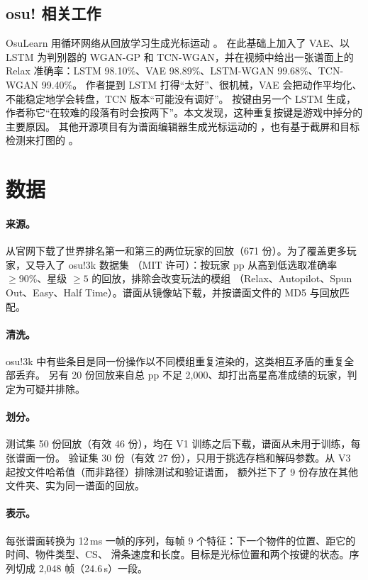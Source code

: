 \documentclass[11pt,a4paper,fontset=windows]{ctexart}
\begin{document}
\subsection{osu! 相关工作}
OsuLearn 用循环网络从回放学习生成光标运动 \citep{osulearn}。\citet{niooii} 在此基础上加入了 VAE、以 LSTM 为判别器的 WGAN-GP
和 TCN-WGAN，并在视频中给出一张谱面上的 Relax 准确率：LSTM 98.10\%、VAE 98.89\%、LSTM-WGAN 99.68\%、TCN-WGAN 99.40\%。
作者提到 LSTM 打得``太好''、很机械，VAE 会把动作平均化、不能稳定地学会转盘，TCN 版本``可能没有调好''。
按键由另一个 LSTM 生成，作者称它``在较难的段落有时会按两下''。本文发现，这种重复按键是游戏中掉分的主要原因。
其他开源项目有为谱面编辑器生成光标运动的 \citep{osucad}，也有基于截屏和目标检测来打图的 \citep{autosu}。

\section{数据}
\paragraph{来源。} 从官网下载了世界排名第一和第三的两位玩家的回放（671 份）。为了覆盖更多玩家，又导入了 osu!3k 数据集
\citep{osu3k}（MIT 许可）：按玩家 pp 从高到低选取准确率 $\ge 90\%$、星级 $\ge 5$ 的回放，排除会改变玩法的模组
（Relax、Autopilot、Spun Out、Easy、Half Time）。谱面从镜像站下载，并按谱面文件的 MD5 与回放匹配。

\paragraph{清洗。} osu!3k 中有些条目是同一份操作以不同模组重复渲染的，这类相互矛盾的重复全部丢弃。
另有 20 份回放来自总 pp 不足 2{,}000、却打出高星高准成绩的玩家，判定为可疑并排除。

\paragraph{划分。} 测试集 50 份回放（有效 46 份），均在 V1 训练之后下载，谱面从未用于训练，每张谱面一份。
验证集 30 份（有效 27 份），只用于挑选存档和解码参数。从 V3 起按文件哈希值（而非路径）排除测试和验证谱面，
额外拦下了 9 份存放在其他文件夹、实为同一谱面的回放。

\paragraph{表示。} 每张谱面转换为 12\,ms 一帧的序列，每帧 9 个特征：下一个物件的位置、距它的时间、物件类型、CS、
滑条速度和长度。目标是光标位置和两个按键的状态。序列切成 2{,}048 帧（24.6\,s）一段。
\end{document}
